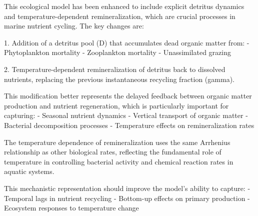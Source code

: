 This ecological model has been enhanced to include explicit detritus dynamics and temperature-dependent remineralization, which are crucial processes in marine nutrient cycling. The key changes are:

1. Addition of a detritus pool (D) that accumulates dead organic matter from:
   - Phytoplankton mortality
   - Zooplankton mortality
   - Unassimilated grazing

2. Temperature-dependent remineralization of detritus back to dissolved nutrients, replacing the previous instantaneous recycling fraction (gamma).

This modification better represents the delayed feedback between organic matter production and nutrient regeneration, which is particularly important for capturing:
- Seasonal nutrient dynamics
- Vertical transport of organic matter
- Bacterial decomposition processes
- Temperature effects on remineralization rates

The temperature dependence of remineralization uses the same Arrhenius relationship as other biological rates, reflecting the fundamental role of temperature in controlling bacterial activity and chemical reaction rates in aquatic systems.

This mechanistic representation should improve the model's ability to capture:
- Temporal lags in nutrient recycling
- Bottom-up effects on primary production
- Ecosystem responses to temperature change
